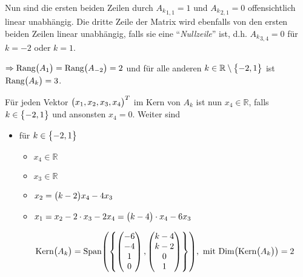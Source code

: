 \documentclass{scrreprt}
\begin{document}
\begin{enumerate}[(a)]
  Nun sind die ersten beiden Zeilen durch ${A_k}_{1, 1} = 1$ und
  ${A_k}_{2, 1} = 0$ offensichtlich linear unabhängig.
  Die dritte Zeile der Matrix wird ebenfalls von den ersten beiden Zeilen linear
  unabhängig, falls sie eine ``\emph{Nullzeile}'' ist, d.h. ${A_k}_{3, 4} = 0$
  für $k = -2$ oder $k  = 1$.

  $\Rightarrow \text{Rang}\qty\big(A_1) = \text{Rang}\qty\big(A_{-2}) = 2$ und
  für alle anderen $k \in \mathbb{R} \setminus \qty\big{-2, 1}$ ist
  $\text{Rang}\qty\big(A_k) = 3$.

  Für jeden Vektor $\qty\big(x_1, x_2, x_3, x_4)^T$ im Kern von $A_k$ ist
  nun $x_4 \in \mathbb{R}$, falls $k \in \qty\big{-2, 1}$ und ansonsten
  $x_4 = 0$.
  Weiter sind
  \begin{itemize}
  \item für $k \in \qty\big{-2, 1}$
    \begin{itemize}[\null]
    \item $x_4 \in \mathbb{R}$
    \item $x_3 \in \mathbb{R}$
    \item $x_2 = \qty\big(k - 2)x_4 - 4x_3$
    \item $x_1 = x_2 - 2 \cdot x_3 - 2 x_4 = \qty\big(k - 4) \cdot x_4 - 6 x_3$
    \end{itemize}
    \[
      \text{Kern}\qty\big(A_k) = \text{Span}\qty(\qty{
        \begin{pmatrix}
          -6 \\
          -4 \\
          1  \\
          0  \\
        \end{pmatrix},
        \begin{pmatrix}
          k - 4 \\
          k - 2 \\
          0     \\
          1     \\
        \end{pmatrix}
      }), \text{ mit }
      \text{Dim}\qty(\text{Kern}\qty\big(A_k)) = 2
    \]


\end{itemize}
\end{enumerate}
\end{document}
